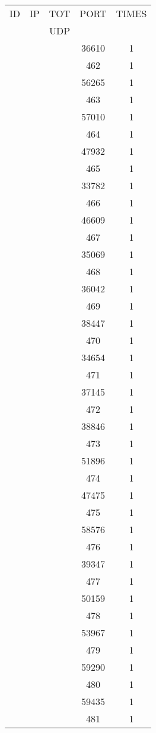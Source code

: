 \documentclass[a4paper]{scrartcl}
\begin{document}
\begin{minipage}[b]{0.5\linewidth}
\begin{tabular}{| c | c | c | c | c |}
\hline
ID & IP & TOT & PORT & TIMES \\ 
   &    & UDP &      &       \\ 
\hline
& & & 36610 & 1 \\ & & & 462 & 1 \\ & & & 56265 & 1 \\ & & & 463 & 1 \\ & & & 57010 & 1 \\ & & & 464 & 1 \\ & & & 47932 & 1 \\ & & & 465 & 1 \\ & & & 33782 & 1 \\ & & & 466 & 1 \\ & & & 46609 & 1 \\ & & & 467 & 1 \\ & & & 35069 & 1 \\ & & & 468 & 1 \\ & & & 36042 & 1 \\ & & & 469 & 1 \\ & & & 38447 & 1 \\ & & & 470 & 1 \\ & & & 34654 & 1 \\ & & & 471 & 1 \\ & & & 37145 & 1 \\ & & & 472 & 1 \\ & & & 38846 & 1 \\ & & & 473 & 1 \\ & & & 51896 & 1 \\ & & & 474 & 1 \\ & & & 47475 & 1 \\ & & & 475 & 1 \\ & & & 58576 & 1 \\ & & & 476 & 1 \\ & & & 39347 & 1 \\ & & & 477 & 1 \\ & & & 50159 & 1 \\ & & & 478 & 1 \\ & & & 53967 & 1 \\ & & & 479 & 1 \\ & & & 59290 & 1 \\ & & & 480 & 1 \\ & & & 59435 & 1 \\ & & & 481 & 1 \\ \hline\end{tabular}\end{minipage} \hfill\begin{minipage}[b]{0.5\linewidth}\begin{tabular}{| c | c | c | c | c |}

\end{tabular}
\end{minipage}
\end{document}

